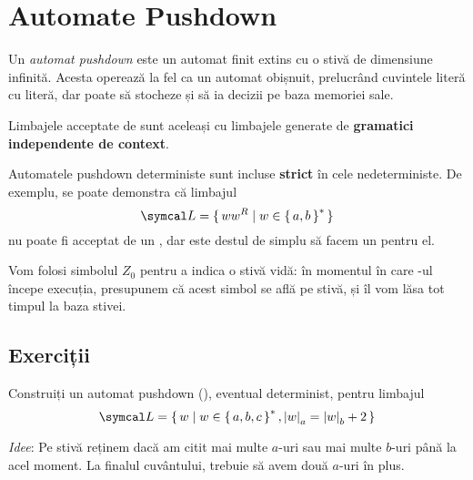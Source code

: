 \section*{Automate Pushdown}

Un \emph{automat pushdown} este un automat finit extins cu o stivă de dimensiune infinită. Acesta operează la fel ca un automat obișnuit, prelucrând cuvintele literă cu literă, dar poate să stocheze și să ia decizii pe baza memoriei sale.

Limbajele acceptate de \pda{} sunt aceleași cu limbajele generate de \textbf{gramatici independente de context}.

Automatele pushdown deterministe sunt incluse \textbf{strict} în cele nedeterministe.
De exemplu, se poate demonstra că limbajul
\[\lang = \set{ w w^R | w \in \set{a, b}^* }\]
nu poate fi acceptat de un \dpda{}, dar este destul de simplu să facem un \npda{} pentru el.

Vom folosi simbolul \(Z_0\) pentru a indica o stivă vidă: în momentul în care \pda{}-ul începe execuția, presupunem că acest simbol se află pe stivă, și îl vom lăsa tot timpul la baza stivei.

\subsection*{Exerciții}

\begin{exercise}
    Construiți un automat pushdown (\pda{}), eventual determinist, pentru limbajul
    \[
        \lang = \set{ w | w \in \set{a, b, c}^*, \abs{w}_a = \abs{w}_b + 2 }
    \]
\end{exercise}

\textit{Idee}: Pe stivă reținem dacă am citit mai multe \(a\)-uri sau mai multe \(b\)-uri până la acel moment. La finalul cuvântului, trebuie să avem două \(a\)-uri în plus.

